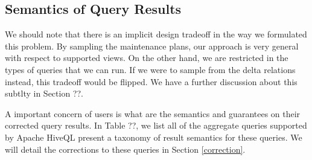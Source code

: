 \subsection{Semantics of Query Results}
We should note that there is an implicit design tradeoff in the way we formulated this problem.
By sampling the maintenance plans, our approach is very general with respect to supported views.
On the other hand, we are restricted in the types of queries that we can run.
If we were to sample from the delta relations instead, this tradeoff would be flipped. 
We have a further discussion about this subtlty in Section ??.

A important concern of users is what are the semantics and guarantees on their corrected query results.
In Table ??, we list all of the aggregate queries supported by Apache HiveQL present a taxonomy of result semantics for these queries.
We will detail the corrections to these queries in Section \ref{correction}.
\fi